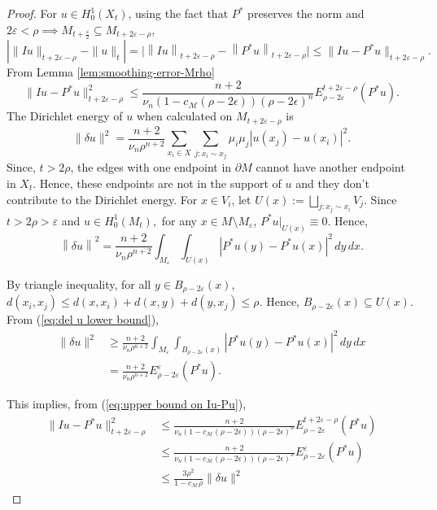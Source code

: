 \documentclass[10 pt, reqno]{amsart}
\theoremstyle{definition}
\numberwithin{equation}{section}
\newcommand{\MMM}{\mathcal{M}}
\newcommand{\norm}[1]{\left\lVert#1\right\rVert}
\begin{document}
\begin{proof}
   For  $u\in H^1_0(X_t)$, using the fact that $P^*$ preserves the norm and $2\varepsilon<\rho\implies M_{t+\frac{\varepsilon}{2}}\subseteq M_{t+2\varepsilon-\rho}$,
   \[|\|Iu\|_{t+2\varepsilon-\rho}-\|u\|_{t}|=\big|\norm{Iu}_{t+2\varepsilon-\rho}-\norm{P^*u}_{t+2\varepsilon-\rho}\big|\le\|Iu-P^*u\|_{t+2\varepsilon-\rho}.\]
 From Lemma \ref{lem:smoothing-error-Mrho}   \begin{equation}
 \label{eq:upper bound on Iu-Pu}
   \|Iu-P^*u\|^2_{t+2\varepsilon-\rho}\le\frac{n+2}{\nu_{n}(1-c_\MMM(\rho-2\epsilon))(\rho-2\epsilon)^{n}} E_{\rho-2\varepsilon}^{t+2\varepsilon-\rho}(P^*u). 
 \end{equation}
 The Dirichlet energy of $u$ when calculated on $M_{t+2\varepsilon-\rho}$ is
 \[  \|\delta u\|^2=\frac{n+2}{\nu_n \rho^{n+2}}\sum_{x_i\in X}\sum_{j:x_i\sim x_j}\mu_i\mu_j|u(x_j)-u(x_i)|^2.  \]
 Since, $t>2\rho$, the edges with one endpoint in $\partial M$ cannot have another endpoint in $X_t$. Hence, these endpoints are not in the support of $u$ and they don't contribute to the Dirichlet energy. For $x\in V_i$, let $U(x):=\bigsqcup_{j:x_j\sim x_i}V_j$. 
 Since $t>2\rho>\varepsilon$ and $u\in H^1_0(M_t), $ for any $x\in M\setminus M_\varepsilon$, $P^*u|_{U(x)}\equiv 0.$ Hence, 
 \begin{equation}
  \norm{\delta u}^2=\frac{n+2}{\nu_n \rho^{n+2}}\int_{M_{\varepsilon}}\int_{U(x)}|P^*u(y)-P^*u(x)|^2\,dy\,dx. \label{eq:del u lower bound}   
 \end{equation}
 


By triangle inequality, for all $y\in B_{\rho-2\varepsilon}(x)$, $d(x_i,x_j)\le d(x,x_i)+d(x,y)+d(y,x_j)\le \rho. $ Hence, $B_{\rho-2\varepsilon}(x)\subseteq U(x).$ From (\ref{eq:del u lower bound}),
\begin{align}
        \|\delta u\|^2&\ge \frac{n+2}{\nu_n \rho^{n+2}}\int_{M_{\varepsilon}}\int_{B_{\rho-2\varepsilon}(x)}|P^*u(y)-P^*u(x)|^2\,dy\,dx\nonumber \\
    &= \frac{n+2}{\nu_n \rho^{n+2}}E^{\varepsilon}_{\rho-2\varepsilon}(P^*u). \label{eq:del_u_bound_dispersion}
\end{align}


This implies, from (\ref{eq:upper bound on Iu-Pu}),
\begin{align}
    \|Iu-P^*u\|^2_{t+2\varepsilon-\rho}&\le\frac{n+2}{\nu_{n}(1-c_\MMM(\rho-2\epsilon))(\rho-2\epsilon)^{n}}E_{\rho-2\varepsilon}^{t+2\varepsilon-\rho}(P^*u)\nonumber\\
    &\le \frac{n+2}{\nu_{n}(1-c_\MMM(\rho-2\epsilon))(\rho-2\epsilon)^{n}}E_{\rho-2\varepsilon}^{\varepsilon}(P^*u)\nonumber\\ &\le \frac{3\rho^2}{1-c_{\MMM}\rho}\|\delta u\|^2 \nonumber
\end{align}


\end{proof}
\end{document}
